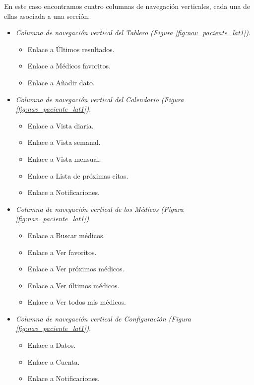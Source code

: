\documentclass[a4paper,oneside,11pt]{book}
\begin{document}
		
		En este caso encontramos cuatro columnas de navegación verticales, cada una de ellas asociada a una sección.
		\begin{itemize}
			\item \textit{Columna de navegación vertical del Tablero (Figura \ref{fig:nav_paciente_lat1})}. 
				\begin{itemize}
					\item Enlace a Últimos resultados.
					\item Enlace a Médicos favoritos.
					\item Enlace a Añadir dato.
				\end{itemize}
			\item \textit{Columna de navegación vertical del Calendario (Figura \ref{fig:nav_paciente_lat1})}.
				\begin{itemize}
					\item Enlace a Vista diaria.
					\item Enlace a Vista semanal.
					\item Enlace a Vista mensual.
					\item Enlace a Lista de próximas citas.
					\item Enlace a Notificaciones.
				\end{itemize}
			\item \textit{Columna de navegación vertical de los Médicos (Figura \ref{fig:nav_paciente_lat1})}.
				\begin{itemize}
					\item Enlace a Buscar médicos.
					\item Enlace a Ver favoritos.
					\item Enlace a Ver próximos médicos.
					\item Enlace a Ver últimos médicos.
					\item Enlace a Ver todos mis médicos.
				\end{itemize}
			\item \textit{Columna de navegación vertical de Configuración (Figura \ref{fig:nav_paciente_lat1})}.
				\begin{itemize}
					\item Enlace a Datos.
					\item Enlace a Cuenta.
					\item Enlace a Notificaciones.
				\end{itemize}
		\end{itemize}
		
\end{document}
